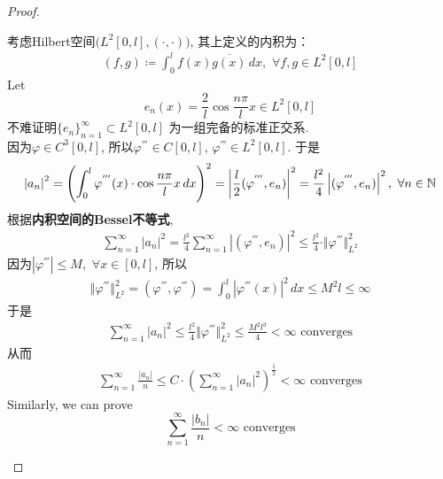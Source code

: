 \begin{thm}
\begin{proof}
\begin{itemize}
\begin{enumerate}
\begin{enumerate}
						考虑Hilbert空间$\Big( L^2[0 , l] , (\cdot , \cdot) \Big)$, 其上定义的内积为：
						\begin{align*}
							(f , g) \coloneqq \int_{0}^l f(x) \overline{g(x)} \, dx , \,\, \forall f , g \in L^2[0 , l]
						\end{align*}
						Let 
						\[ e_n(x) = \frac{2}{l} \cos \frac{n\pi}{l} x \in L^2[0 , l] \]
						不难证明$\{ e_n \}_{n = 1}^{\infty} \subset L^2[0 , l]$ 为一组完备的标准正交系. \\
						因为$\varphi \in C^3[0 , l]$, 所以$\varphi^{'''} \in C[0 , l]$, $\varphi^{'''} \in L^2[0 , l]$. 于是
						\begin{align*}
							\left| a_n \right|^2 
							= \left( \int_{0}^l \varphi^{'''}(x) \cdot \cos \frac{n\pi}{l} x \, dx \right)^2 
							= \left| \frac{l}{2} (\varphi^{'''} , e_n) \right|^2 
							= \frac{l^2}{4} \left| (\varphi^{'''} , e_n) \right|^2 , \,\, \forall n \in \mathbb{N}
						\end{align*}
						根据\textbf{内积空间的Bessel不等式}, 
						\begin{align*}
							\sum_{n = 1}^{\infty} \left| a_n \right|^2 
							= \frac{l^2}{4} \sum_{n = 1}^{\infty} \left| (\varphi^{'''} , e_n) \right|^2 
							\leq \frac{l^2}{4} \cdot \Vert \varphi^{'''} \Vert_{L^2}^2
						\end{align*}
						因为$\left| \varphi^{'''} \right| \leq M , \,\, \forall x \in [0 , l]$, 所以
						\begin{align*}
							\Vert \varphi^{'''} \Vert_{L^2}^2 
							= (\varphi^{'''} , \varphi^{'''}) 
							= \int_{0}^l \left| \varphi^{'''}(x) \right|^2 \, dx 
							\leq M^2 l \leq \infty
						\end{align*}
						于是
						\begin{align*}
							\sum_{n = 1}^{\infty} \left| a_n \right|^2 \leq \frac{l^2}{4} \Vert \varphi^{'''} \Vert_{L^2}^2 \leq \frac{M^2 l^3}{4} < \infty \,\, \text{converges}
						\end{align*}
						从而
						\begin{align*}
							\sum_{n = 1}^{\infty} \frac{\left| a_n \right|}{n} 
							\leq C \cdot \left( \sum_{n = 1}^{\infty} \left| a_n \right|^2 \right)^{\tfrac{1}{2}} 
							< \infty \,\, \text{converges}
						\end{align*}
						Similarly, we can prove 
						\[ \sum_{n = 1}^{\infty} \frac{\left| b_n \right|}{n} < \infty \,\, \text{converges} \]
					\end{enumerate}
				\end{enumerate}
				

\end{itemize}
\end{proof}
\end{thm}
